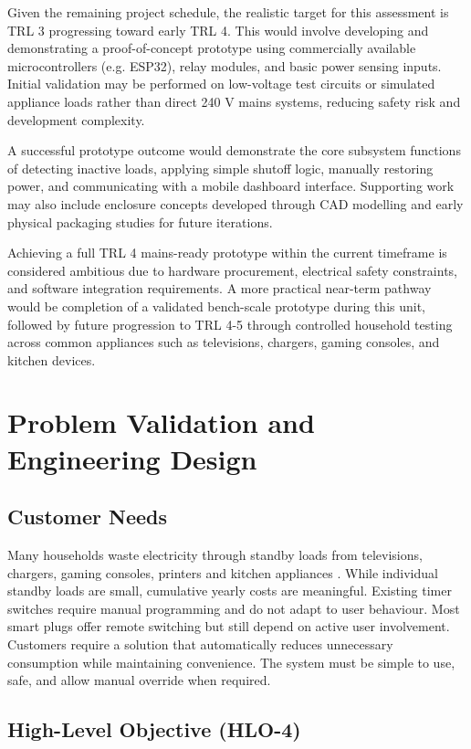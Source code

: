 \documentclass[11pt, twoside, a4paper]{article}
\begin{document}
Given the remaining project schedule, the realistic target for this assessment is TRL 3 progressing toward early TRL 4. This would involve developing and 
demonstrating a proof-of-concept prototype using commercially available microcontrollers (e.g. ESP32), relay modules, and basic power sensing inputs. Initial 
validation may be performed on low-voltage test circuits or simulated appliance loads rather than direct 240 V mains systems, reducing safety risk and development 
complexity.

A successful prototype outcome would demonstrate the core subsystem functions of detecting inactive loads, applying simple shutoff logic, manually restoring power,
 and communicating with a mobile dashboard interface. Supporting work may also include enclosure concepts developed through CAD modelling and early physical packaging 
 studies for future iterations.

Achieving a full TRL 4 mains-ready prototype within the current timeframe is considered ambitious due to hardware procurement, electrical safety constraints, and 
software integration requirements. A more practical near-term pathway would be completion of a validated bench-scale prototype during this unit, followed by future 
progression to TRL 4-5 through controlled household testing across common appliances such as televisions, chargers, gaming consoles, and kitchen devices.

\section{Problem Validation and Engineering Design}
\subsection{Customer Needs}
Many households waste electricity through standby loads from televisions, chargers, gaming consoles, printers and kitchen appliances \cite{energygovstandby}. While individual standby loads are small, 
cumulative yearly costs are meaningful. Existing timer switches require manual programming and do not adapt to user behaviour. Most smart plugs offer remote switching but still 
depend on active user involvement. Customers require a solution that automatically reduces unnecessary consumption while maintaining convenience. The system must be simple to use, 
safe, and allow manual override when required.

\subsection{High-Level Objective (HLO-4)}
\end{document}
